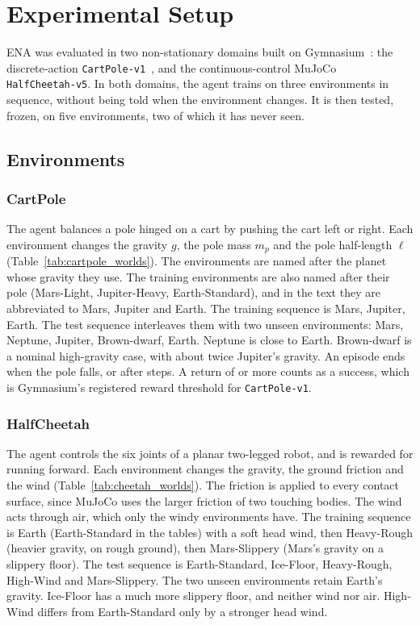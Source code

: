 \section{Experimental Setup}
\label{sec:setup}

ENA was evaluated in two non-stationary domains built on Gymnasium~\citep{towers2024gymnasium}: the discrete-action \texttt{CartPole-v1}~\citep{barto1983neuronlike}, and the continuous-control MuJoCo~\citep{todorov2012mujoco} \texttt{HalfCheetah-v5}. In both domains, the agent trains on three environments in sequence, without being told when the environment changes. It is then tested, frozen, on five environments, two of which it has never seen.

\subsection{Environments}

\subsubsection{CartPole}
The agent balances a pole hinged on a cart by pushing the cart left or right. Each environment changes the gravity $g$, the pole mass $m_p$ and the pole half-length $\ell$ (Table~\ref{tab:cartpole_worlds}). The environments are named after the planet whose gravity they use. The training environments are also named after their pole (Mars-Light, Jupiter-Heavy, Earth-Standard), and in the text they are abbreviated to Mars, Jupiter and Earth. The training sequence is Mars, Jupiter, Earth. The test sequence interleaves them with two unseen environments: Mars, Neptune, Jupiter, Brown-dwarf, Earth. Neptune is close to Earth. Brown-dwarf is a nominal high-gravity case, with about twice Jupiter's gravity. An episode ends when the pole falls, or after  steps. A return of  or more counts as a success, which is Gymnasium's registered reward threshold for \texttt{CartPole-v1}.



\subsubsection{HalfCheetah}
The agent controls the six joints of a planar two-legged robot, and is rewarded for running forward. Each environment changes the gravity, the ground friction and the wind (Table~\ref{tab:cheetah_worlds}). The friction is applied to every contact surface, since MuJoCo uses the larger friction of two touching bodies. The wind acts through air, which only the windy environments have. The training sequence is Earth (Earth-Standard in the tables) with a soft head wind, then Heavy-Rough (heavier gravity, on rough ground), then Mars-Slippery (Mars's gravity on a slippery floor). The test sequence is Earth-Standard, Ice-Floor, Heavy-Rough, High-Wind and Mars-Slippery. The two unseen environments retain Earth's gravity. Ice-Floor has a much more slippery floor, and neither wind nor air. High-Wind differs from Earth-Standard only by a stronger head wind.

